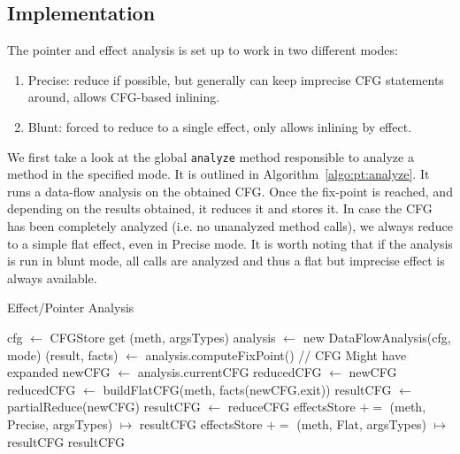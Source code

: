 \documentclass[a4paper]{article}
\begin{document}
\subsection{Implementation}
The pointer and effect analysis is set up to work in two different modes:
\begin{enumerate}
    \item Precise: reduce if possible, but generally can keep imprecise CFG
    statements around, allows CFG-based inlining.
    \item Blunt: forced to reduce to a single effect, only allows inlining by
    effect.
\end{enumerate}

We first take a look at the global \verb=analyze= method responsible to analyze
a method in the specified mode. It is outlined in
Algorithm~\ref{algo:pt:analyze}. It runs a data-flow analysis on the obtained
CFG.  Once the fix-point is reached, and depending on the results obtained, it
reduces it and stores it. In case the CFG has been completely analyzed (i.e. no
unanalyzed method calls), we always reduce to a simple flat effect, even in
Precise mode. It is worth noting that if the analysis is run in blunt mode, all
calls are analyzed and thus a flat but imprecise effect is always available.

\begin{algorithm}
\caption{Effect/Pointer Analysis}\label{algo:pt:analyze}
\begin{algorithmic}[1]
    \State cfg $\gets$ CFGStore get (meth, argsTypes)
    \State analysis $\gets$ new DataFlowAnalysis(cfg, mode)
    \State (result, facts) $\gets$ analysis.computeFixPoint()
    \State // CFG Might have expanded
    \State newCFG $\gets$ analysis.currentCFG
        \State reducedCFG $\gets$ newCFG
    \Else
        \State reducedCFG $\gets$ buildFlatCFG(meth, facts(newCFG.exit))
    \EndIf
    \State
        \State resultCFG $\gets$ partialReduce(newCFG)
    \Else
        \State resultCFG $\gets$ reduceCFG
    \EndIf
    \State
        \State effectsStore $+=$ (meth, Precise, argsTypes) $\mapsto$ resultCFG
    \EndIf
    \State
        \State effectsStore $+=$ (meth, Flat, argsTypes) $\mapsto$ resultCFG
    \EndIf
    \State
    \State \Return resultCFG
\EndFunction
\end{algorithmic}
\end{algorithm}
\end{document}
